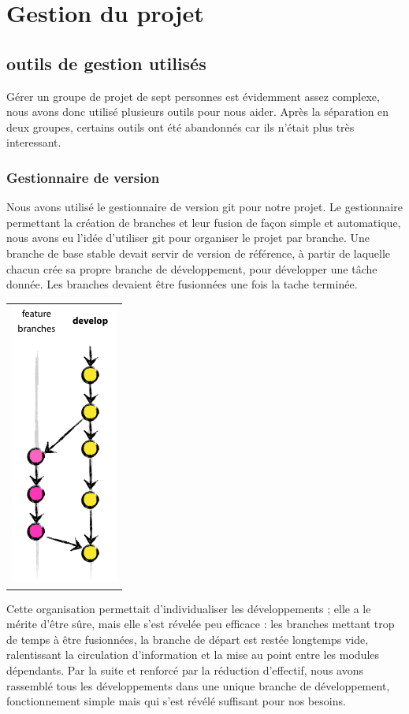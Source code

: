 \chapter{Gestion du projet}

\section{outils de gestion utilisés}

Gérer un groupe de projet de sept personnes est évidemment assez complexe, nous avons donc utilisé plusieurs outils pour nous aider. Après la séparation en deux groupes, certains outils ont été abandonnés car ils n'était plus très interessant.

\subsection{Gestionnaire de version}

Nous avons utilisé le gestionnaire de version git pour notre projet. Le gestionnaire permettant la création de branches et leur fusion de façon simple et automatique, nous avons eu l'idée d'utiliser git pour organiser le projet par branche. Une branche de base stable devait servir de version de référence, à partir de laquelle chacun crée sa propre branche de développement, pour développer une tâche donnée. Les branches devaient être fusionnées une fois la tache terminée. 

\begin{tabular}{c}
\includegraphics{Images/feature_branches.png}
\end{tabular}

Cette organisation permettait d'individualiser les développements ; elle a le mérite d'être sûre, mais elle s'est révelée peu efficace : les branches mettant trop de temps à être fusionnées, la branche de départ est restée longtemps vide, ralentissant la circulation d'information et la mise au point entre les modules dépendants. Par la suite et renforcé par la réduction d'effectif, nous avons rassemblé tous les développements dans une unique branche de développement, fonctionnement simple mais qui s'est révélé suffisant pour nos besoins. 

